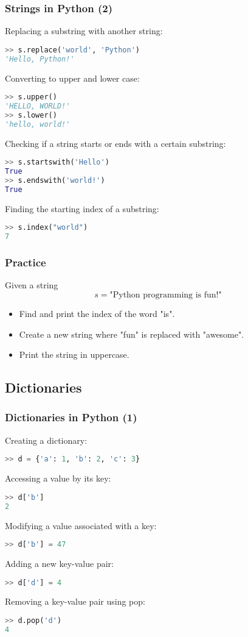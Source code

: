 \begin{frame}[fragile]
  \frametitle{Strings in Python (2)}
  Replacing a substring with another string:
  \begin{lstlisting}[language=Python,numbers=none,basicstyle=\scriptsize]
>> s.replace('world', 'Python')
'Hello, Python!'
  \end{lstlisting}\pause
  Converting to upper and lower case:
  \begin{lstlisting}[language=Python,numbers=none,basicstyle=\scriptsize]
>> s.upper()
'HELLO, WORLD!'
>> s.lower()
'hello, world!'
  \end{lstlisting}\pause
  Checking if a string starts or ends with a certain substring:
  \begin{lstlisting}[language=Python,numbers=none,basicstyle=\scriptsize]
>> s.startswith('Hello')
True
>> s.endswith('world!')
True
  \end{lstlisting}
  Finding the starting index of a substring:
  \begin{lstlisting}[language=Python,numbers=none,basicstyle=\scriptsize]
>> s.index("world")
7
  \end{lstlisting}
\end{frame}

\begin{frame}[fragile]
  \frametitle{Practice}
  Given a string
  \[
     s = \text{"Python programming is fun!"}
  \]
  \begin{itemize}
   \item Find and print the index of the word "is".\pause
   \item Create a new string where "fun" is replaced with "awesome".\pause
   \item Print the string in uppercase.
  \end{itemize}
 \end{frame}


\subsection*{Dictionaries}
\begin{frame}[fragile]
  \frametitle{Dictionaries in Python (1)}
  Creating a dictionary:
  \begin{lstlisting}[language=Python,numbers=none]
>> d = {'a': 1, 'b': 2, 'c': 3}
  \end{lstlisting}\pause
  Accessing a value by its key:
  \begin{lstlisting}[language=Python,numbers=none]
>> d['b']
2
  \end{lstlisting}\pause
  Modifying a value associated with a key:
  \begin{lstlisting}[language=Python,numbers=none]
>> d['b'] = 47
  \end{lstlisting}\pause
  Adding a new key-value pair:
  \begin{lstlisting}[language=Python,numbers=none]
>> d['d'] = 4
  \end{lstlisting}\pause
  Removing a key-value pair using pop:
  \begin{lstlisting}[language=Python,numbers=none]
>> d.pop('d')
4
  \end{lstlisting}
\end{frame}

